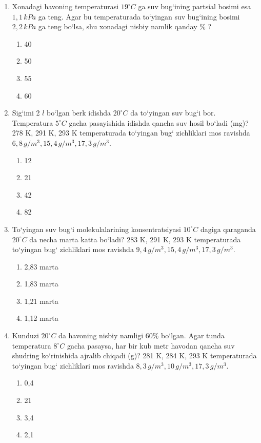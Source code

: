 \begin{enumerate}
\item Xonadagi havoning temperaturasi $19^\circ C$ ga suv bug‘ining partsial bosimi esa $1,1 \, kPa$ ga teng. Agar bu temperaturada to‘yingan suv bug‘ining bosimi $2,2 \, kPa$ ga teng bo‘lsa, shu xonadagi nisbiy namlik qanday \% ?
\begin{enumerate}[label=\Alph*)]
\item 40
\item 50
\item 55
\item 60
\end{enumerate}

\item Sig‘imi 2 $l$ bo‘lgan berk idishda $20^\circ C$ da to‘yingan suv bug‘i bor. Temperatura $5^\circ C$ gacha pasayishida idishda qancha suv hosil bo‘ladi (mg)? 278 K, 291 K, 293 K temperaturada to‘yingan bug‘ zichliklari mos ravishda $6,8 \, g/m^3, 15,4 \, g/m^3, 17,3 \, g/m^3$.
\begin{enumerate}[label=\Alph*)]
\item 12
\item 21
\item 42
\item 82
\end{enumerate}

\item To‘yingan suv bug‘i molekulalarining konsentratsiyasi $10^\circ C$ dagiga qaraganda $20^\circ C$ da necha marta katta bo‘ladi? 283 K, 291 K, 293 K temperaturada to‘yingan bug‘ zichliklari mos ravishda $9,4 \, g/m^3, 15,4 \, g/m^3, 17,3 \, g/m^3$.
\begin{enumerate}[label=\Alph*)]
\item 2,83 marta
\item 1,83 marta
\item 1,21 marta
\item 1,12 marta
\end{enumerate}

\item Kunduzi $20^\circ C$ da havoning nisbiy namligi 60\% bo‘lgan. Agar tunda temperatura $8^\circ C$ gacha pasaysa, har bir kub metr havodan qancha suv shudring ko‘rinishida ajralib chiqadi (g)? 281 K, 284 K, 293 K temperaturada to‘yingan bug‘ zichliklari mos ravishda $8,3 \, g/m^3, 10 \, g/m^3, 17,3 \, g/m^3$.
\begin{enumerate}[label=\Alph*)]
\item 0,4
\item 21
\item 3,4
\item 2,1
\end{enumerate}


\end{enumerate}
